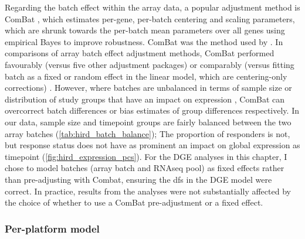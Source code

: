 Regarding the batch effect within the array data, a popular adjustment method is ComBat \autocite{johnson2007AdjustingBatchEffects}, which estimates per-gene, per-batch centering and scaling parameters, which are shrunk towards the per-batch mean parameters over all genes using empirical Bayes to improve robustness.
ComBat was the method used by \textcite{sobolev2016AdjuvantedInfluenzaH1N1Vaccination}.
In comparisons of array batch effect adjustment methods, ComBat performed favourably (versus five other adjustment packages) \autocite{chen2011RemovingBatchEffects} or comparably (versus fitting batch as a fixed or random effect in the linear model, which are centering-only corrections) \autocite{espin-perez2018ComparisonStatisticalMethods}.
However, where batches are unbalanced in terms of sample size \autocite{zhang2018AlternativeEmpiricalBayes} or distribution of study groups that have an impact on expression \autocite{nygaard2015MethodsThatRemove}, ComBat can overcorrect batch differences or bias estimates of group differences respectively.
In our data, sample size and timepoint groups are fairly balanced between the two array batches (\cref{tab:hird_batch_balance});
The proportion of responders is not, but response status does not have as prominent an impact on global expression as timepoint (\cref{fig:hird_expression_pcs}).
For the \gls{DGE} analyses in this chapter, I chose to model batches (array batch and \gls{RNAseq} pool) as fixed effects rather than pre-adjusting with Combat, ensuring the \glspl{df} in the \gls{DGE} model were correct.
In practice, results from the analyses were not substantially affected by the choice of whether to use a ComBat pre-adjustment or a fixed effect.
%



\subsubsection{Per-platform  model}

